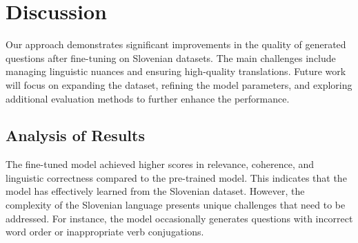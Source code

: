 \documentclass[fleqn,moreauthors,10pt]{ds_report}
\begin{document}



\section*{Discussion}
Our approach demonstrates significant improvements in the quality of generated questions after fine-tuning on Slovenian datasets. The main challenges include managing linguistic nuances and ensuring high-quality translations. Future work will focus on expanding the dataset, refining the model parameters, and exploring additional evaluation methods to further enhance the performance.


\subsection*{Analysis of Results}
The fine-tuned model achieved higher scores in relevance, coherence, and linguistic correctness compared to the pre-trained model. This indicates that the model has effectively learned from the Slovenian dataset. However, the complexity of the Slovenian language presents unique challenges that need to be addressed. For instance, the model occasionally generates questions with incorrect word order or inappropriate verb conjugations.
\end{document}
